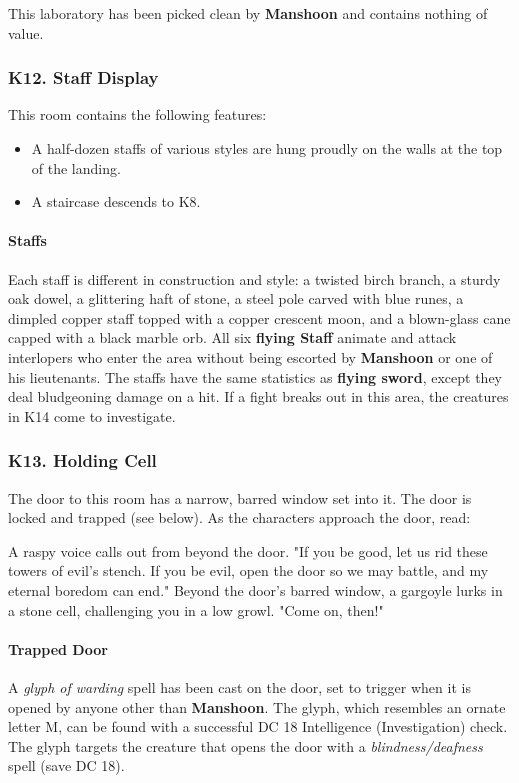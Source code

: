 \documentclass[10pt,a4paper,twoside,twocolumn,openany,nodeprecatedcode]{dndbook}
\begin{document}
This laboratory has been picked clean by \textbf{Manshoon} and contains nothing of value.
\subsubsection{K12. Staff Display}
This room contains the following features:
\begin{itemize}

\item A half-dozen staffs of various styles are hung proudly on the walls at the top of the landing.
\item A staircase descends to K8.
\end{itemize}


\paragraph{Staffs}
Each staff is different in construction and style: a twisted birch branch, a sturdy oak dowel, a glittering haft of stone, a steel pole carved with blue runes, a dimpled copper staff topped with a copper crescent moon, and a blown-glass cane capped with a black marble orb.
All six \textbf{flying Staff} animate and attack interlopers who enter the area without being escorted by \textbf{Manshoon} or one of his lieutenants. The staffs have the same statistics as \textbf{flying sword}, except they deal bludgeoning damage on a hit. If a fight breaks out in this area, the creatures in K14 come to investigate.
\subsubsection{K13. Holding Cell}
The door to this room has a narrow, barred window set into it. The door is locked and trapped (see below). As the characters approach the door, read:
\begin{DndReadAloud}{}
A raspy voice calls out from beyond the door. "If you be good, let us rid these towers of evil's stench. If you be evil, open the door so we may battle, and my eternal boredom can end." Beyond the door's barred window, a gargoyle lurks in a stone cell, challenging you in a low growl. "Come on, then!"
\end{DndReadAloud}

\paragraph{Trapped Door}
A \textit{glyph of warding} spell has been cast on the door, set to trigger when it is opened by anyone other than \textbf{Manshoon}. The glyph, which resembles an ornate letter M, can be found with a successful DC 18 Intelligence (Investigation) check. The glyph targets the creature that opens the door with a \textit{blindness/deafness} spell (save DC 18).
\end{document}
